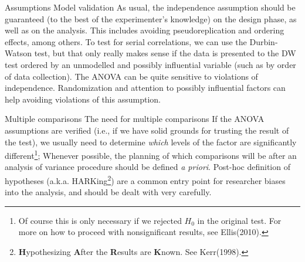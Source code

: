 \documentclass[t]{beamer}
\begin{document}
\begin{ftstf}
{Assumptions}
{Model validation}
As usual, the independence assumption should be guaranteed (to the best of the experimenter's knowledge) on the design phase, as well as on the analysis. This includes avoiding pseudoreplication and ordering effects, among others.
\vone
To test for serial correlations, we can use the Durbin-Watson test, but that only really makes sense if the data is presented to the DW test ordered by an unmodelled and possibly influential variable (such as by order of data collection).
%
\vone
The ANOVA can be quite sensitive to violations of independence. Randomization and attention to possibly influential factors can help avoiding violations of this assumption.
\end{ftstf}


\begin{ftst}
{Multiple comparisons}
{The need for multiple comparisons}
If the ANOVA assumptions are verified (i.e., if we have solid grounds for trusting the result of the test), we usually need to determine \textit{which} levels of the factor are significantly different\footnote[1]{\tiny Of course this is only necessary if we rejected $H_0$ in the original test. For more on how to proceed with nonsignificant results, see Ellis(2010).};
\vone
Whenever possible, the planning of which comparisons will be after an analysis of variance procedure should be defined \textit{a priori}. Post-hoc definition of hypotheses (a.k.a.  HARKing\footnote[2]{\tiny\textbf{H}ypothesizing \textbf{A}fter the \textbf{R}esults are \textbf{K}nown. See Kerr(1998).}) are a common entry point for researcher biases into the analysis, and should be dealt with very carefully.
\end{ftst}
\end{document}
